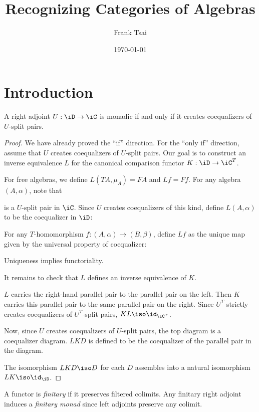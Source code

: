 \documentclass{amsart}
\title{Recognizing Categories of Algebras}
\author{Frank Tsai}
\date{\today}
\begin{document}
\maketitle
\tableofcontents

\section{Introduction}
\label{sec:introduction}

\begin{thm}\label{thm:monadicity-theorem}
  A right adjoint $U : \iD \to \iC$ is monadic if and only if it creates coequalizers of $U$-split pairs.
\end{thm}
\begin{proof}
  We have already proved the ``if'' direction.
  For the ``only if'' direction, assume that $U$ creates coequalizers of $U$-split pairs.
  Our goal is to construct an inverse equivalence $L$ for the canonical comparison functor $K : \iD \to \iC^{T}$.

  For free algebras, we define $L(TA,\mu_{A}) = FA$ and $Lf = Ff$.
  For any algebra $(A, \alpha)$, note that
  
  is a $U$-split pair in $\iC$.
  Since $U$ creates coequalizers of this kind, define $L(A,\alpha)$ to be the coequalizer in $\iD$:
  
  For any $T$-homomorphism $f : (A, \alpha) \to (B, \beta)$, define $Lf$ as the unique map given by the universal property of coequalizer:
  
  Uniqueness implies functoriality.

  It remains to check that $L$ defines an inverse equivalence of $K$.
  
  $L$ carries the right-hand parallel pair to the parallel pair on the left.
  Then $K$ carries this parallel pair to the same parallel pair on the right.
  Since $U^{T}$ strictly creates coequalizers of $U^{T}$-split pairs, $KL \iso \id_{\iC^{T}}$.

  Now, since $U$ creates coequalizers of $U$-split pairs, the top diagram is a coequalizer diagram.
  $LKD$ is defined to be the coequalizer of the parallel pair in the diagram.
  
  The isomorphism $LKD \iso D$ for each $D$ assembles into a natural isomorphism $LK \iso \id_{\iD}$.
\end{proof}

\begin{defn}
  A functor is \emph{finitary} if it preserves filtered colimits.
  Any finitary right adjoint induces a \emph{finitary monad} since left adjoints preserve any colimit.
\end{defn}
\end{document}
